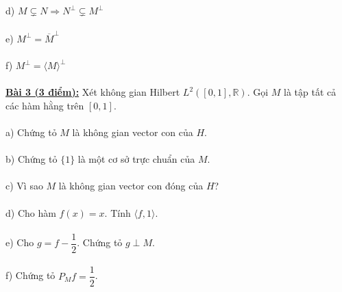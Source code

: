 \documentclass[10pt, a4paper]{article}
\begin{document}
\color{red}d) \color{black}$M\subsetneq N\Rightarrow N^\perp\subsetneq M^\perp$\\\\
\color{red}e) \color{black}$M^\perp=\overline M^\perp$\\\\
\color{red}f) \color{black}$M^\perp=\langle M\rangle^\perp$\\\\
\color{red}\underline{\textbf{Bài 3 (3 điểm):}} \color{black}Xét không gian Hilbert $L^2([0,1],\mathbb R)$. Gọi $M$ là tập tất cả các hàm hằng trên $[0,1]$.\\\\
\color{red}a) \color{black}Chứng tỏ $M$ là không gian vector con của $H$.\\\\
\color{red}b) \color{black}Chứng tỏ $\{1\}$ là một cơ sở trực chuẩn của $M$.\\\\
\color{red}c) \color{black}Vì sao $M$ là không gian vector con đóng của $H$?\\\\
\color{red}d) \color{black}Cho hàm $f(x)=x$. Tính $\langle f,1\rangle$.\\\\
\color{red}e) \color{black}Cho $g=f-\dfrac12$. Chứng tỏ $g\perp M$.\\\\
\color{red}f) \color{black}Chứng tỏ $P_Mf=\dfrac12$.

\newpage
\end{document}
